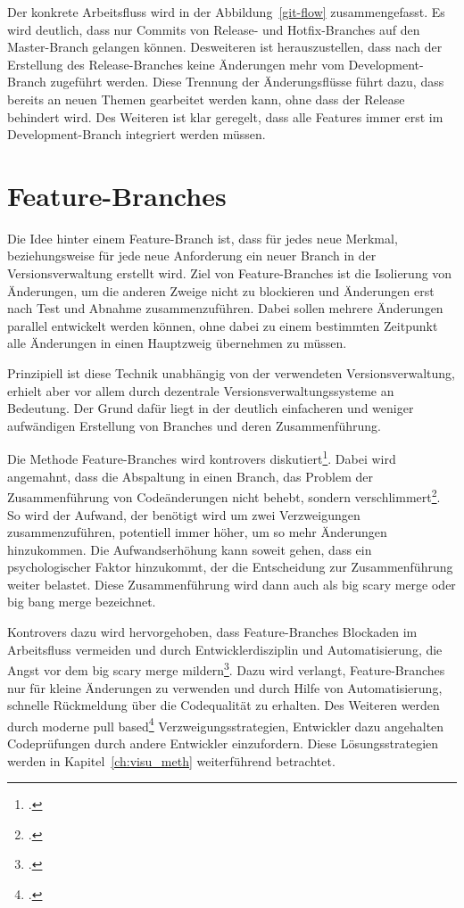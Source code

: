Der konkrete Arbeitsfluss wird in der Abbildung~\ref{git-flow} zusammengefasst. Es wird deutlich, dass nur Commits von 
Release- und Hotfix-Branches auf den Master-Branch gelangen können. Desweiteren ist herauszustellen, dass nach der 
Erstellung des Release-Branches keine Änderungen mehr vom Development-Branch zugeführt werden. Diese Trennung der 
Änderungsflüsse führt dazu, dass bereits an neuen Themen gearbeitet werden kann, ohne dass der Release behindert wird. 
Des Weiteren ist klar geregelt, dass alle Features immer erst im Development-Branch integriert werden müssen.

\section{Feature-Branches}
\label{sec:feature-branches}
Die Idee hinter einem Feature-Branch ist, dass für jedes neue Merkmal, beziehungsweise für jede neue Anforderung ein 
neuer Branch in der Versionsverwaltung erstellt wird. Ziel von Feature-Branches ist die Isolierung von Änderungen, um die 
anderen Zweige nicht zu blockieren und Änderungen erst nach Test und Abnahme zusammenzuführen. Dabei sollen mehrere 
Änderungen parallel entwickelt werden können, ohne dabei zu einem bestimmten Zeitpunkt alle Änderungen in einen 
Hauptzweig übernehmen zu müssen.

Prinzipiell ist diese Technik unabhängig von der verwendeten Versionsverwaltung, erhielt aber vor allem durch dezentrale 
Versionsverwaltungssysteme an Bedeutung. Der Grund dafür liegt in der deutlich einfacheren und weniger aufwändigen Erstellung von Branches und deren Zusammenführung.

Die Methode Feature-Branches wird kontrovers diskutiert\footcite[vgl.][]{fb-revisited}. 
Dabei wird angemahnt, dass die Abspaltung in einen Branch, das Problem der Zusammenführung von Codeänderungen nicht behebt, sondern verschlimmert\footcite[vgl.][]{fowler-feature-branch}. So wird der Aufwand, der benötigt wird um zwei Verzweigungen zusammenzuführen, potentiell immer höher, um so mehr Änderungen hinzukommen. Die Aufwandserhöhung kann soweit gehen, dass ein psychologischer Faktor 
hinzukommt, der die Entscheidung zur Zusammenführung weiter belastet. Diese Zusammenführung wird dann auch als \glqq big scary merge\grqq{} oder \glqq big bang merge\grqq{} bezeichnet.

Kontrovers dazu wird hervorgehoben, dass Feature-Branches Blockaden im Arbeitsfluss vermeiden und durch Entwicklerdisziplin und Automatisierung, die Angst vor dem \glqq big scary merge\grqq{} mildern\footcite[vgl.][]{ci-is-dead}. Dazu wird verlangt, Feature-Branches nur für kleine Änderungen zu verwenden und durch Hilfe von Automatisierung, schnelle Rückmeldung über die Codequalität zu erhalten. Des Weiteren werden durch moderne \glqq pull based\grqq{}\footcite[vgl.][]{github-about-pull} Verzweigungsstrategien, Entwickler dazu angehalten Codeprüfungen durch andere Entwickler einzufordern. Diese Lösungsstrategien werden in Kapitel~\ref{ch:visu_meth} weiterführend betrachtet.